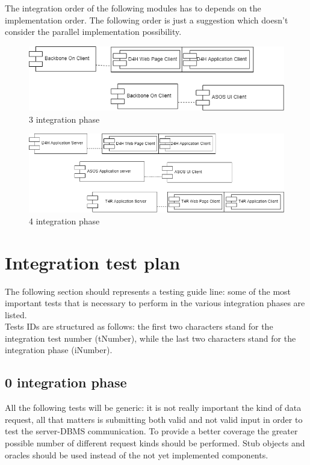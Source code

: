 The integration order of the following modules has to depends on the implementation order. The following order is just a suggestion which doesn't consider the parallel implementation possibility.
\begin{figure}[H]
\caption{3 integration phase}
\includegraphics[width = \textwidth]{sections/implementationIntegrationTestGraphs/IntegrationOrder3phase.png}
\end{figure}
\begin{figure}[H]
\caption{4 integration phase}
\includegraphics[width = \textwidth]{sections/implementationIntegrationTestGraphs/IntegrationOrder4phase.png}
\end{figure}

\section{Integration test plan}
The following section should represents  a testing guide line: some of the most important tests that is necessary to perform in the various integration phases are listed. \\
Tests IDs are structured as follows: the first two characters stand for the integration test number (tNumber), while the last two characters stand for the  integration phase (iNumber).
\subsection{0 integration phase}

All the following tests will be generic: it is not really important the kind of data request, all that matters is submitting both valid and not valid input in order to test the server-DBMS communication. To provide a better coverage the greater possible number of different request kinds should be performed. Stub objects and oracles should be used instead of the not yet implemented components.

